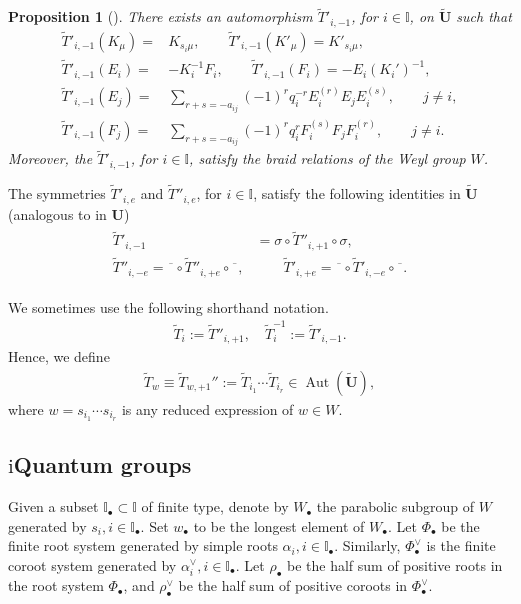 \documentclass[a4paper,reqno,12pt]{amsart}
\numberwithin{equation}{section}
\newtheorem{proposition}{Proposition}[section]
\theoremstyle{definition}
\theoremstyle{plain}
\theoremstyle{definition}
\def\I{\mathbb I}
\def\bI{\I_\bullet}
\def\bw{w_\bullet}
\def\tU{\widetilde{\mathbf U}}
\def\tTD{\widetilde T}
\newcommand{\Aut}{\operatorname{Aut}\nolimits}
\newcommand{\obar}{\overline{\phantom{o}}}
\begin{document}
\begin{proposition}
  [{\cite[Proposition 6.21]{LW21b}}]
   \label{prop:braid1}
 There exists an automorphism $\tTD'_{i,-1}$, for $i\in \I$, on $\tU$ such that
\begin{align*}
\tTD'_{i,-1}(K_{\mu})=&K_{s_i\mu},\qquad \tTD'_{i,-1}(K'_{\mu})=K'_{s_i\mu}, \\
        \tTD'_{i,-1}(E_i)=&-K_i^{-1}F_i,\qquad \tTD'_{i,-1}(F_i)=-E_i(K_i')^{-1},\\
		\tTD'_{i,-1}(E_{j})=&\sum_{r+s=-a_{ij}}(-1)^{r}q_i^{-r}E_i^{(r)}E_{j}E_i^{(s)},\qquad j\neq i,
			\\
		\tTD'_{i,-1}(F_{j})=&\sum_{r+s=-a_{ij}}(-1)^{r}q_i^{r}F_i^{(s)}F_{j}F_i^{(r)},\qquad j\neq i.
\end{align*}
Moreover, the $\tTD'_{i,-1}$, for $i\in \I$, satisfy the braid relations of the Weyl group $W$.
\end{proposition}

The symmetries $\tTD'_{i,e}$ and $\tTD''_{i,e}$, for $i\in \I$, satisfy the following identities in $\tU$ \cite{LW21b} (analogous to  \cite[37.2.4]{Lus93} in $\mathbf U$)
\begin{align}
  \label{eq:sTs}
  \begin{split}
  \tTD'_{i,-1} &=\sigma \circ \tTD''_{i,+1} \circ \sigma,
  \\
  \tTD''_{i,-e} = \obar \circ \tTD''_{i,+e} \circ \obar,
  & \qquad
  \tTD'_{i,+e} = \obar \circ \tTD'_{i,-e} \circ \obar.
  \end{split}
\end{align}


We sometimes use the following shorthand notation.
\begin{align*}
    \tTD_{i}:= \tTD''_{i,+1},\quad \tTD_{i}^{-1}:= \tTD'_{i,-1}.
\end{align*}
Hence, we define
\begin{align*}  
\tTD_w \equiv \tTD_{w,+1}'' :=\tTD_{i_1}\cdots \tTD_{i_r} \in \Aut (\tU),
\end{align*}
where $w=s_{i_1} \cdots s_{i_r}$ is any reduced expression of $w\in W$.



\subsection{${\mathrm i}$Quantum groups}
Given a subset $\bI\subset \I$ of finite type, denote by $W_{\bullet}$ the parabolic subgroup of $W$ generated by $s_i,i\in \bI.$ Set $\bw$ to be the longest element of $W_\bullet$. Let $\Phi_{\bullet}$ be the finite root system generated by simple roots $\alpha_i,i\in \bI.$ Similarly, $\Phi_\bullet^\vee$ is the finite coroot system generated by $\alpha_i^\vee,i\in \bI.$
Let $\rho_\bullet$ be the half sum of positive roots in the root system $\Phi_{\bullet}$, and $\rho_\bullet^\vee$ be the half sum of positive coroots in $\Phi_\bullet^\vee$.
\end{document}
